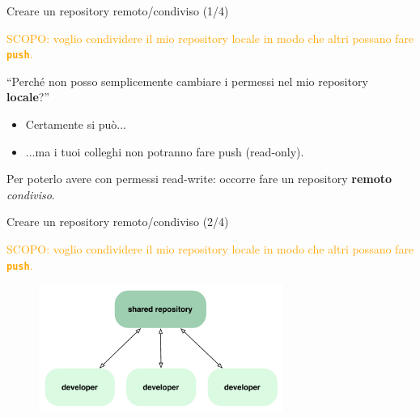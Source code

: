 \documentclass{beamer}
\begin{document}
\begin{frame}{\centerline{Creare un repository remoto/condiviso (1/4)}}
  \begin{center}
    \textcolor{orange}{SCOPO: voglio condividere il mio repository locale in modo che altri possano fare \texttt{\textbf{push}}.}
  \end{center}
  ``Perch\'{e} non posso semplicemente cambiare i permessi nel mio repository \textbf{locale}?''
  \begin{itemize}
  \item Certamente si pu\`{o}...
  \item ...ma i tuoi colleghi non potranno fare push (\alert{read-only}).
  \end{itemize}
  \begin{center}
    Per poterlo avere con permessi \alert{read-write}: occorre fare un repository \textbf{remoto}
    \emph{condiviso}.
  \end{center}
\end{frame}


\begin{frame}{\centerline{Creare un repository remoto/condiviso (2/4)}}
  \begin{center}
    \textcolor{orange}{SCOPO: voglio condividere il mio repository locale in modo che altri possano fare \texttt{\textbf{push}}.}
  \end{center}

  \begin{figure}
    \centering
    \includegraphics[width=8cm]{A2023.LavoroCondiviso/workflow-a}
  \end{figure}
\end{frame}
\end{document}
